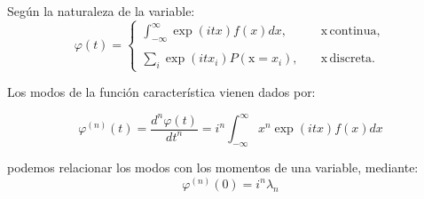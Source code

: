 \documentclass[openany]{book}
\begin{document}
Según la naturaleza de la variable:
\begin{equation}
  \label{eq:func-carac}
  \varphi(t)=\begin{cases}
    \displaystyle\int_{-\infty}^{\infty}\exp{(itx)}f(x)dx,\quad &\mathrm{x}\,\text{continua},\\
    \\
    \displaystyle\sum_{i}\exp{(itx_{i})}P(\mathrm{x}=x_{i}),\quad &\mathrm{x}\,\text{discreta}.
  \end{cases}
\end{equation}

\par Los modos de la función característica vienen dados por:

\begin{equation}
  \label{eq:modos-func-caract}
  \varphi^{(n)}(t)=\frac{d^{n}\varphi(t)}{dt^{n}}=i^{n}\int_{-\infty}^{\infty}x^{n}\exp{(itx)}f(x)dx
\end{equation}

podemos relacionar los modos con los momentos de una variable, mediante:
\begin{equation*}
  \varphi^{(n)}(0)=i^{n}\lambda_{n}
\end{equation*}
\end{document}

